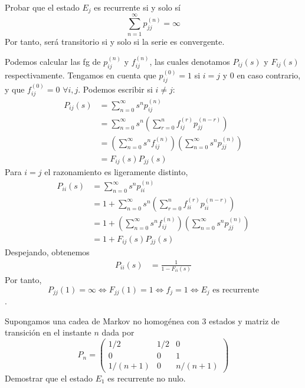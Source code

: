 \documentclass[twoside]{article}
\begin{document}
\newpage

\begin{ejercicio}{5} Probar que el estado $E_j$ es recurrente si y solo sí 
$$
\sum_{n = 1}^\infty p_{jj}^{(n)} = \infty
$$
Por tanto, será transitorio si y solo si la serie es convergente.
\end{ejercicio}

\begin{solucion}
Podemos calcular las fg de $p_{ij}^{(n)}$ y $f_{ij}^{(n)}$, las cuales denotamos $P_{ij}(s)$ y $F_{ij}(s)$ respectivamente. Tengamos en cuenta que $p_{ij}^{(0)}=1$ si $i=j$ y $0$ en caso contrario, y que $f_{ij}^{(0)} = 0$ $\forall i,j$. Podemos escribir si $i\neq j$:
\begin{align*}
P_{ij}(s) &= \sum_{n=0}^\infty s^n p_{ij}^{(n)}\\
&= \sum_{n=0}^\infty s^n \left(\sum_{r=0}^{n}f_{ij}^{(r)}p_{jj}^{(n-r)}\right)\\
&=  \left(\sum_{n=0}^\infty s^n f_{ij}^{(n)}\right)\left( \sum_{n=0}^\infty s^n p_{jj}^{(n)}\right)\\
&=  F_{ij}(s)P_{jj}(s)
\end{align*}
Para $i=j$ el razonamiento es ligeramente distinto,
\begin{align*}
P_{ii}(s) &= \sum_{n=0}^\infty s^n p_{ii}^{(n)}\\
&= 1+\sum_{n=0}^\infty s^n \left(\sum_{r=0}^{n}f_{ii}^{(r)}p_{ii}^{(n-r)}\right)\\
&= 1+ \left(\sum_{n=0}^\infty s^n f_{ij}^{(n)}\right)\left( \sum_{n=0}^\infty s^n p_{jj}^{(n)}\right)\\
&=  1 + F_{ij}(s)P_{jj}(s)
\end{align*}
Despejando, obtenemos
\begin{align*}
P_{ii}(s) &= \frac{1}{1-F_{ii}(s)} 
\end{align*}
Por tanto, $$P_{jj}(1)=\infty \Leftrightarrow  F_{jj}(1)=1 \Leftrightarrow f_j = 1 \Leftrightarrow \text{$E_j$ es recurrente}$$ .
\end{solucion}
\newpage


\begin{ejercicio}{7}Supongamos una cadea de Markov no homogénea con $3$ estados y matriz de transición en el instante $n$ dada por
$$
P_n=
\begin{pmatrix}
1/2 & 1/2 & 0\\
0 & 0 & 1\\
1/(n+1) & 0 & n/(n+1)
\end{pmatrix}
$$
Demostrar que el estado $E_1$ es recurrente no nulo.
\end{ejercicio}
\end{document}
